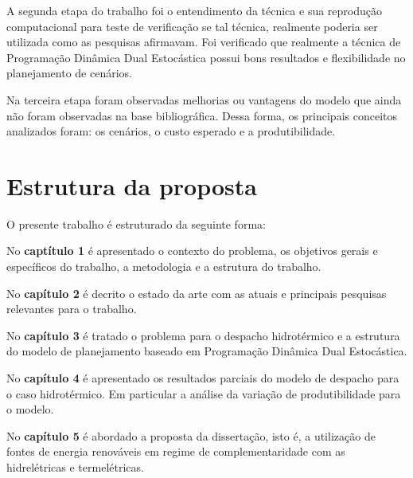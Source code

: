A segunda etapa do trabalho foi o entendimento da t\'ecnica e sua reprodu\c c\~ao computacional para teste de verifica\c
c\~ao se tal t\'ecnica, realmente poderia ser utilizada como as pesquisas afirmavam. Foi verificado que realmente a
t\'ecnica de Programa\c c\~ao Din\^amica Dual Estoc\'astica possui bons resultados e  flexibilidade no
planejamento de cen\'arios. 

Na terceira etapa foram observadas melhorias ou vantagens do modelo que ainda n\~ao foram  observadas na base
bibliogr\'afica. Dessa forma, os principais conceitos analizados foram: os cen\'arios, o custo esperado e a
produtibilidade.
\section{Estrutura da proposta}
O presente trabalho \'e estruturado da seguinte forma:

No \textbf{capt\'itulo 1} \'e apresentado o contexto do problema, os objetivos gerais e espec\'ificos do trabalho, 
a metodologia e a estrutura do trabalho.

No \textbf{cap\'itulo 2} \'e decrito o estado da arte com as atuais e principais pesquisas relevantes para o trabalho.

No \textbf{cap\'itulo 3} \'e tratado o problema para o despacho hidrot\'ermico e a estrutura do modelo de planejamento
		baseado em Programa\c c\~ao Din\^amica Dual Estoc\'astica.

No \textbf{cap\'itulo 4} \'e apresentado os resultados parciais do modelo de despacho para o caso hidrot\'ermico. Em particular a an\'alise da varia\c c\~ao de produtibilidade para o modelo.

No \textbf{cap\'itulo 5} \'e abordado a proposta da disserta\c c\~ao, isto \'e,  a utiliza\c c\~ao de fontes de energia
renov\'aveis em regime de complementaridade com as hidrel\'etricas e termel\'etricas.

